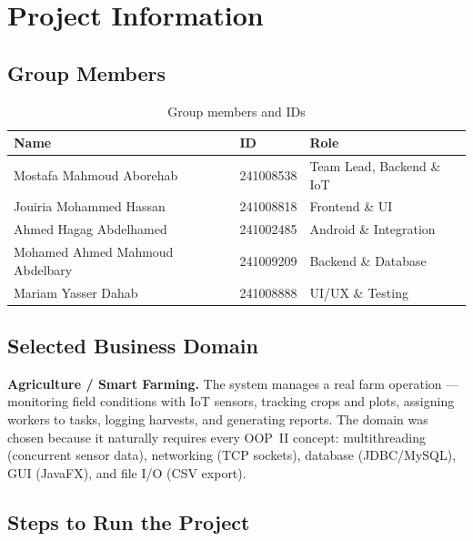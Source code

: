 \documentclass[12pt, a4paper]{report}
\begin{document}
\tableofcontents
\newpage


\chapter{Project Information}

\section{Group Members}

\begin{table}[H]
\centering
\renewcommand{\arraystretch}{1.5}
\begin{tabularx}{\textwidth}{l l X}
\toprule
\textbf{Name} & \textbf{ID} & \textbf{Role} \\
\midrule
Mostafa Mahmoud Aborehab        & 241008538 & Team Lead, Backend \& IoT \\
Jouiria Mohammed Hassan         & 241008818 & Frontend \& UI \\
Ahmed Hagag Abdelhamed          & 241002485 & Android \& Integration \\
Mohamed Ahmed Mahmoud Abdelbary & 241009209 & Backend \& Database \\
Mariam Yasser Dahab             & 241008888 & UI/UX \& Testing \\
\bottomrule
\end{tabularx}
\caption{Group members and IDs}
\end{table}

\section{Selected Business Domain}

\textbf{Agriculture / Smart Farming.} The system manages a real farm operation --- monitoring field conditions with IoT sensors, tracking crops and plots, assigning workers to tasks, logging harvests, and generating reports. The domain was chosen because it naturally requires every OOP~II concept: multithreading (concurrent sensor data), networking (TCP sockets), database (JDBC/MySQL), GUI (JavaFX), and file I/O (CSV export).

\section{Steps to Run the Project}
\end{document}
